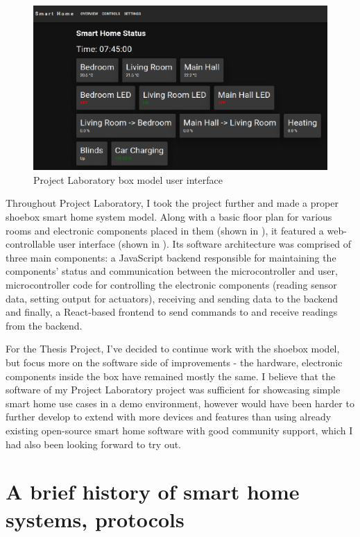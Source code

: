 \begin{figure}[!ht]
    \centering
    \includegraphics[width=120mm, keepaspectratio]{figures/proj_lab_ui.png}
    \caption{Project Laboratory box model user interface}
    \label{fig:ProjLabUI}
\end{figure}

Throughout Project Laboratory, I took the project further and made a proper shoebox smart home system model. Along with a basic floor plan for various rooms and electronic components placed in them (shown in ), it featured a web-controllable user interface (shown in ). Its software architecture was comprised of three main components: a JavaScript backend responsible for maintaining the components' status and communication between the microcontroller and user, microcontroller code for controlling the electronic components (reading sensor data, setting output for actuators), receiving and sending data to the backend and finally, a React-based frontend to send commands to and receive readings from the backend.

For the Thesis Project, I've decided to continue work with the shoebox model, but focus more on the software side of improvements - the hardware, electronic components inside the box have remained mostly the same. I believe that the software of my Project Laboratory project was sufficient for showcasing simple smart home use cases in a demo environment, however would have been harder to further develop to extend with more devices and features than using already existing open-source smart home software with good community support, which I had also been looking forward to try out.

\section{A brief history of smart home systems, protocols}

